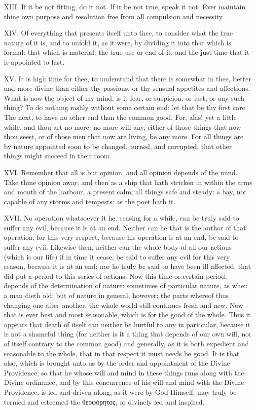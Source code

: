 XIII. If it be not fitting, do it not. If it be not true, speak it not.
Ever maintain thine own purpose and resolution free from all compulsion
and necessity.

XIV. Of everything that presents itself unto thee, to consider what the
true nature of it is, and to unfold it, as it were, by dividing it into
that which is formal: that which is material: the true use or end of it,
and the just time that it is appointed to last.

XV. It is high time for thee, to understand that there is somewhat in
thee, better and more divine than either thy passions, or thy sensual
appetites and affections. What is now the object of my mind, is it fear,
or suspicion, or lust, or any such thing? To do nothing rashly without
some certain end; let that be thy first care. The next, to have no other
end than the common good. For, alas! yet a little while, and thou art no
more: no more will any, either of those things that now thou seest, or of
those men that now are living, be any more. For all things are by nature
appointed soon to be changed, turned, and corrupted, that other things
might succeed in their room.

XVI. Remember that all is but opinion, and all opinion depends of the
mind. Take thine opinion away, and then as a ship that hath stricken in
within the arms and mouth of the harbour, a present calm; all things safe
and steady: a bay, not capable of any storms and tempests: as the poet
hath it.

XVII. No operation whatsoever it he, ceasing for a while, can be truly
said to suffer any evil, because it is at an end. Neither can he that is
the author of that operation; for this very respect, because his operation
is at an end, be said to suffer any evil. Likewise then, neither can the
whole body of all our actions (which is our life) if in time it cease, be
said to suffer any evil for this very reason, because it is at an end; nor
he truly be said to have been ill affected, that did put a period to this
series of actions. Now this time or certain period, depends of the
determination of nature: sometimes of particular nature, as when a man
dieth old; but of nature in general, however; the parts whereof thus
changing one after another, the whole world still continues fresh and new.
Now that is ever best and most seasonable, which is for the good of the
whole. Thus it appears that death of itself can neither be hurtful to any
in particular, because it is not a shameful thing (for neither is it a
thing that depends of our own will, nor of itself contrary to the common
good) and generally, as it is both expedient and seasonable to the whole,
that in that respect it must needs be good. It is that also, which is
brought unto us by the order and appointment of the Divine Providence; so
that he whose will and mind in these things runs along with the Divine
ordinance, and by this concurrence of his will and mind with the Divine
Providence, is led and driven along, as it were by God Himself; may truly
be termed and esteemed the
θεοφόρητος, or
divinely led and inspired.

